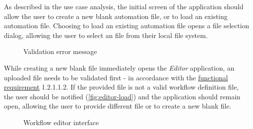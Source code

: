 As described in the use case analysis, the initial screen of the application should allow the user to create a new blank automation file, or to load an existing automation file.
Choosing to load an existing automation file opens a file selection dialog, allowing the user to select an file from their local file system.

\begin{figure}[!h]
    \begin{center}
    \end{center}
    \caption{Validation error message}\label{fig:editor-load}
\end{figure}
While creating a new blank file immediately opens the \textit{Editor} application, an uploaded file needs to be validated first - in accordance with the \hyperref[requirements]{functional requirement} 1.2.1.1.2.
If the provided file is not a valid workflow definition file, the user should be notified (\autoref{fig:editor-load}) and the application should remain open, allowing the user to provide different file or to create a new blank file.
\clearpage

\begin{figure}[h!]
    \begin{center}
    \end{center}
    \caption{Workflow editor interface} \label{fig:editor-workflow}
\end{figure}

